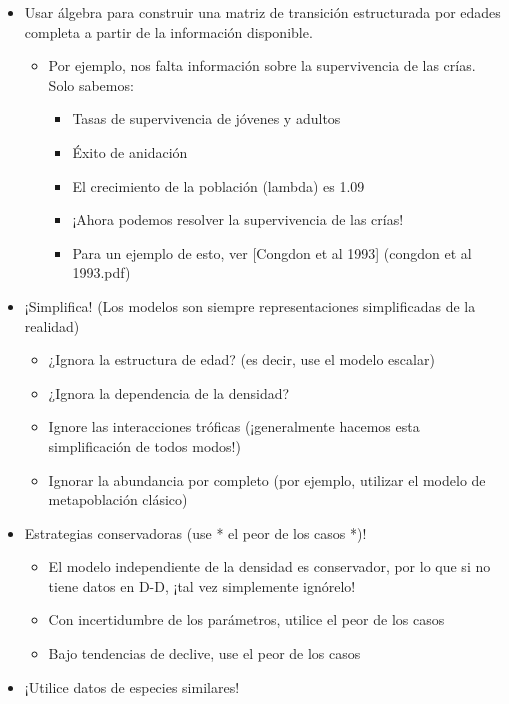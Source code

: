 \documentclass[
]{article}
\providecommand{\tightlist}{%
  \setlength{\itemsep}{0pt}\setlength{\parskip}{0pt}}
\begin{document}
\begin{itemize}
\tightlist
\item
  Usar álgebra para construir una matriz de transición estructurada por
  edades completa a partir de la información disponible.

  \begin{itemize}
  \tightlist
  \item
    Por ejemplo, nos falta información sobre la supervivencia de las
    crías. Solo sabemos:

    \begin{itemize}
    \tightlist
    \item
      Tasas de supervivencia de jóvenes y adultos
    \item
      Éxito de anidación
    \item
      El crecimiento de la población (lambda) es 1.09
    \item
      ¡Ahora podemos resolver la supervivencia de las crías!
    \item
      Para un ejemplo de esto, ver {[}Congdon et al 1993{]} (congdon et
      al 1993.pdf)
    \end{itemize}
  \end{itemize}
\item
  ¡Simplifica! (Los modelos son siempre representaciones simplificadas
  de la realidad)

  \begin{itemize}
  \tightlist
  \item
    ¿Ignora la estructura de edad? (es decir, use el modelo escalar)
  \item
    ¿Ignora la dependencia de la densidad?
  \item
    Ignore las interacciones tróficas (¡generalmente hacemos esta
    simplificación de todos modos!)
  \item
    Ignorar la abundancia por completo (por ejemplo, utilizar el modelo
    de metapoblación clásico)
  \end{itemize}
\item
  Estrategias conservadoras (use * el peor de los casos *)!

  \begin{itemize}
  \tightlist
  \item
    El modelo independiente de la densidad es conservador, por lo que si
    no tiene datos en D-D, ¡tal vez simplemente ignórelo!
  \item
    Con incertidumbre de los parámetros, utilice el peor de los casos
  \item
    Bajo tendencias de declive, use el peor de los casos
  \end{itemize}
\item
  ¡Utilice datos de especies similares!


\end{itemize}
\end{document}
